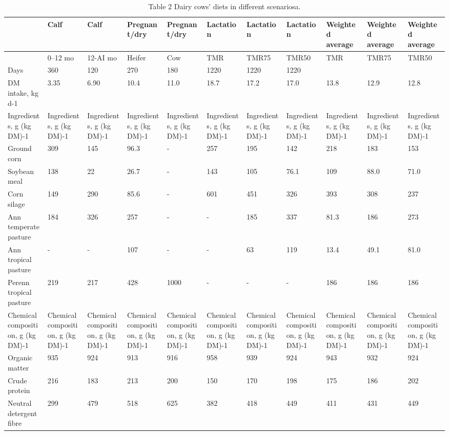 \documentclass[11pt,a4paper]{article}
\begin{document}
\begin{table}[h]
\caption{Table 2 Dairy cows’ diets in different scenariosa.}
\begin{tabular}{|l|l|l|l|l|l|l|l|l|l|l|}
\hline
 & Calf & Calf & Pregnant/dry & Pregnant/dry & Lactation & Lactation & Lactation & Weighted average & Weighted average & Weighted average \\ \hline
 & 0–12 mo & 12-AI mo & Heifer & Cow & TMR & TMR75 & TMR50 & TMR & TMR75 & TMR50 \\ \hline
Days & 360 & 120 & 270 & 180 & 1220 & 1220 & 1220 &  &  &  \\ \hline
DM intake, kg d-1 & 3.35 & 6.90 & 10.4 & 11.0 & 18.7 & 17.2 & 17.0 & 13.8 & 12.9 & 12.8 \\ \hline
Ingredients, g (kg DM)-1 & Ingredients, g (kg DM)-1 & Ingredients, g (kg DM)-1 & Ingredients, g (kg DM)-1 & Ingredients, g (kg DM)-1 & Ingredients, g (kg DM)-1 & Ingredients, g (kg DM)-1 & Ingredients, g (kg DM)-1 & Ingredients, g (kg DM)-1 & Ingredients, g (kg DM)-1 & Ingredients, g (kg DM)-1 \\ \hline
Ground corn & 309 & 145 & 96.3 & - & 257 & 195 & 142 & 218 & 183 & 153 \\ \hline
Soybean meal & 138 & 22 & 26.7 & - & 143 & 105 & 76.1 & 109 & 88.0 & 71.0 \\ \hline
Corn silage & 149 & 290 & 85.6 & - & 601 & 451 & 326 & 393 & 308 & 237 \\ \hline
Ann temperate pasture & 184 & 326 & 257 & - & - & 185 & 337 & 81.3 & 186 & 273 \\ \hline
Ann tropical pasture & - & - & 107 & - & - & 63 & 119 & 13.4 & 49.1 & 81.0 \\ \hline
Perenn tropical pasture & 219 & 217 & 428 & 1000 & - & - & - & 186 & 186 & 186 \\ \hline
Chemical composition, g (kg DM)-1 & Chemical composition, g (kg DM)-1 & Chemical composition, g (kg DM)-1 & Chemical composition, g (kg DM)-1 & Chemical composition, g (kg DM)-1 & Chemical composition, g (kg DM)-1 & Chemical composition, g (kg DM)-1 & Chemical composition, g (kg DM)-1 & Chemical composition, g (kg DM)-1 & Chemical composition, g (kg DM)-1 & Chemical composition, g (kg DM)-1 \\ \hline
Organic matter & 935 & 924 & 913 & 916 & 958 & 939 & 924 & 943 & 932 & 924 \\ \hline
Crude protein & 216 & 183 & 213 & 200 & 150 & 170 & 198 & 175 & 186 & 202 \\ \hline
Neutral detergent fibre & 299 & 479 & 518 & 625 & 382 & 418 & 449 & 411 & 431 & 449 \\ \hline

\end{tabular}
\end{table}
\end{document}
